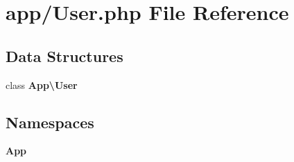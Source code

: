 \section{app/\+User.php File Reference}
\label{app_2_user_8php}
\subsection*{Data Structures}
\begin{DoxyCompactItemize}
\item 
class {\bf App\textbackslash{}\+User}
\end{DoxyCompactItemize}
\subsection*{Namespaces}
\begin{DoxyCompactItemize}
\item 
 {\bf App}
\end{DoxyCompactItemize}
